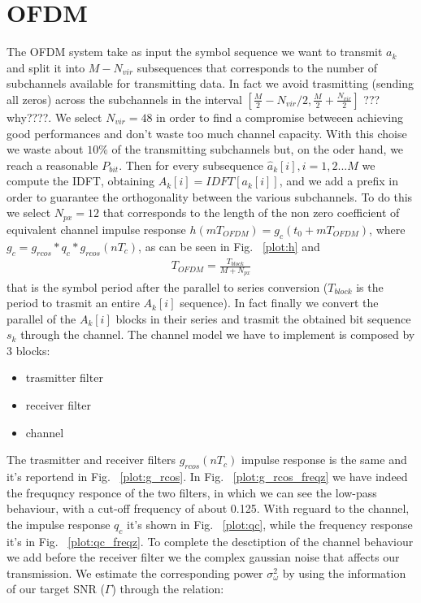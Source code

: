 \documentclass[a4paper,oneside]{article}
\begin{document}
\section{OFDM}
\label{sec:ofdm}
The OFDM system take as input the symbol sequence we want to transmit $a_k$ and split it into $M-N_{vir}$ subsequences that corresponds to the number of subchannels available for transmitting data. In fact we avoid trasmitting (sending all zeros) across the subchannels in the interval $[\frac{M}{2}-N_{vir}/2,\frac{M}{2}+\frac{N_{vir}}{2}]$ ???why????.
We select $N_{vir} = 48$ in order to find a compromise betweeen achieving good performances and don't waste too much channel capacity. With this choise we waste about $ 10\% $ of the transmitting subchannels but, on the oder hand, we reach a reasonable $ P_{bit} $.
Then for every subsequence $\hat{a}_k[i], i = 1,2...M$ we compute the IDFT, obtaining $A_k[i] = IDFT[a_k[i]]$, and we add a prefix in order to guarantee the orthogonality between the various subchannels. To do this we select $N_{px} = 12$ that corresponds to the length of the non zero coefficient of equivalent channel impulse response $h(mT_{OFDM}) = g_c(t_0+ mT_{OFDM})$, where $g_c = g_{rcos}*q_c*g_{rcos}(nT_c)$, as can be seen in Fig. ~\ref{plot:h} and 
\begin{align*}
T_{OFDM} = \frac{T_{block}}{M+N_{px}}
\end{align*} 
that is the symbol period after the parallel to series conversion ($T_{block}$ is the period to trasmit an entire $A_k[i]$ sequence).
In fact finally we convert the parallel of the $A_k[i]$ blocks in their series and trasmit the obtained bit sequence $s_k$ through the channel.
\newline The channel model we have to implement is composed by 3 blocks:
\begin{itemize}
\item trasmitter filter
\item receiver filter
\item channel
\end{itemize} 
The trasmitter and receiver filters $g_{rcos}(nT_c)$ impulse response is the same and it's reportend in Fig. ~\ref{plot:g_rcos}. In Fig. ~\ref{plot:g_rcos_freqz} we have indeed the frequqncy responce of the two filters, in which we can see the low-pass behaviour, with a cut-off frequency of about 0.125. With reguard to the channel, the impulse response $q_c$ it's shown in Fig. ~\ref{plot:qc}, while the frequency response it's in Fig. ~\ref{plot:qc_freqz}.
To complete the desctiption of the channel behaviour we add before the receiver filter we the complex gaussian noise that affects our transmission. We estimate the corresponding power $\sigma_{\omega}^2$ by using the information of our target SNR ($\Gamma$) through the relation:
\end{document}
